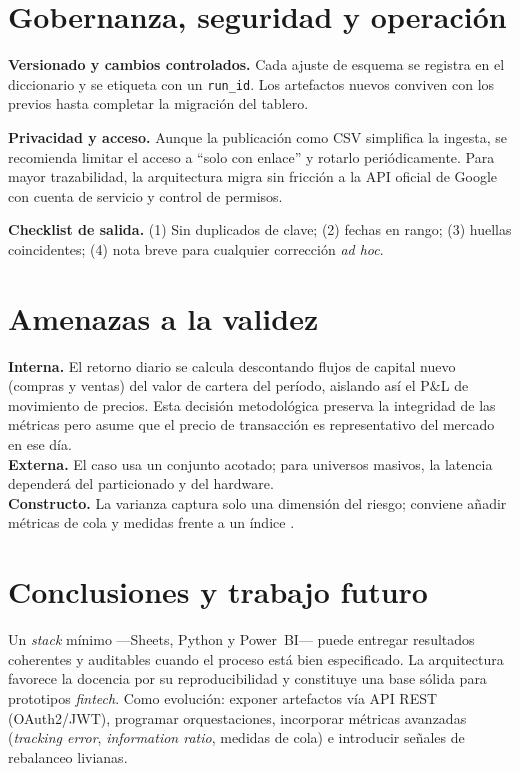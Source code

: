 \documentclass[conference]{IEEEtran}
\begin{document}
\section{Gobernanza, seguridad y operación}
\textbf{Versionado y cambios controlados.} Cada ajuste de esquema se registra en el diccionario y se etiqueta con un \texttt{run\_id}. Los artefactos nuevos conviven con los previos hasta completar la migración del tablero.

\textbf{Privacidad y acceso.} Aunque la publicación como CSV simplifica la ingesta, se recomienda limitar el acceso a “solo con enlace” y rotarlo periódicamente. Para mayor trazabilidad, la arquitectura migra sin fricción a la API oficial de Google con cuenta de servicio y control de permisos.

\textbf{Checklist de salida.} (1) Sin duplicados de clave; (2) fechas en rango; (3) huellas coincidentes; (4) nota breve para cualquier corrección \emph{ad hoc}.

\section{Amenazas a la validez}
\textbf{Interna.} El retorno diario se calcula descontando flujos de capital nuevo (compras y ventas) del valor de cartera del período, aislando así el P\&L de movimiento de precios. Esta decisión metodológica preserva la integridad de las métricas pero asume que el precio de transacción es representativo del mercado en ese día. \\
\textbf{Externa.} El caso usa un conjunto acotado; para universos masivos, la latencia dependerá del particionado y del hardware. \\
\textbf{Constructo.} La varianza captura solo una dimensión del riesgo; conviene añadir métricas de cola y medidas frente a un índice \cite{macias2020,ramirez2016}.

\section{Conclusiones y trabajo futuro}
Un \emph{stack} mínimo —Sheets, Python y Power~BI— puede entregar resultados coherentes y auditables cuando el proceso está bien especificado. La arquitectura favorece la docencia por su reproducibilidad y constituye una base sólida para prototipos \emph{fintech}. Como evolución: exponer artefactos vía API REST (OAuth2/JWT), programar orquestaciones, incorporar métricas avanzadas (\emph{tracking error}, \emph{information ratio}, medidas de cola) e introducir señales de rebalanceo livianas.
\end{document}

